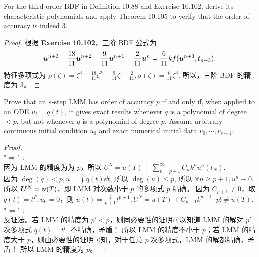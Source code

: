 \documentclass[lang=cn,a4paper,newtx,bibend=bibtex]{elegantpaper}
\begin{document}
\begin{prob}[Exercise 10.107]
  For the third-order BDF in Definition
  10.88 and Exercise 10.102, derive its characteristic
  polynomials and apply Theorem 10.105 to verify that the order of
  accuracy is indeed 3.
\end{prob}

\begin{proof}
  根据 \textbf{Exercise 10.102}，三阶 BDF 公式为
  \[
    \bm{u}^{n+3} - \frac{18}{11} \bm{u}^{n+2} + \frac{9}{11}\bm{u}^{n+1} - \frac2{11}\bm{u}^n = \frac6{11} k f(\bm{u}^{n+3}, t_{n+3}).
  \]
  特征多项式为 $\rho(\zeta) = \zeta^3 - \frac{18}{11} \zeta^2 + \frac9{11} \zeta - \frac2{11}, \sigma(\zeta) = \frac6{11} \zeta^3$.
  所以，三阶 BDF 的精度为 3。
\end{proof}

\begin{prob}[Exercise 10.108]
  Prove that an $s$-step LMM has order of
 accuracy $p$ if and only if, when applied to an ODE $u_t = q(t)$,
 it gives exact results whenever $q$ is a polynomial of degree
 $< p$, but not whenever $q$ is a polynomial of degree $p$. Assume
 arbitrary continuous initial condition $u_0$ and exact
  numerical initial data $v_0, \cdots, v_{s-1}$.
\end{prob}

\begin{proof}~~\\
"$\Rightarrow$" : \\
因为 LMM 的精度为为 $p$，所以 $U^N = u(T) + \sum_{n = p+1}^{\infty} C_n k^n u^{n}(t_N)$.\\
因为 $\deg(q) < p, u = \int q(t)\dd t$, 所以 $\deg(u) \le p$, 所以 $\forall n \ge p + 1, u^{n} \equiv 0$.\\
所以 $\bm{U}^N = \bm{u}(T)$，即 LMM 对次数小于 $p$ 的多项式 $p$ 精确。
因为 $C_{p+1} \neq 0$，取 $q(t) = t^P,u_0 = 0$，则 $u(t) = \frac1{p+1}t^{p+1}, U^N = u(T) + C_{p+1}k^{p+1}\cdot p! \neq u(T)$.\\
"$\Leftarrow$" : \\
反证法。若 LMM 的精度为 $p' < p$，则同必要性的证明可以知道 LMM 的解对 $p'$ 次多项式 $q(t) = t^{p'}$ 不精确，矛盾！
所以 LMM 的精度不小于 $p$；若 LMM 的精度大于 $p$，则由必要性的证明可知，对于任意 $p$ 次多项式，LMM 的解都精确，矛盾！
所以 LMM 的精度为 $p$。
\end{proof}
\end{document}
